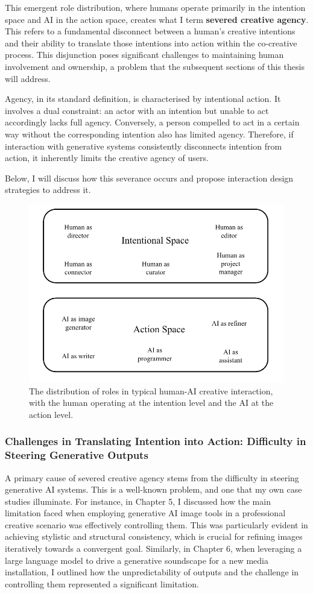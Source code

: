 This emergent role distribution, where humans operate primarily in the intention space and AI in the action space, creates what I term \textbf{severed creative agency}. This refers to a fundamental disconnect between a human's creative intentions and their ability to translate those intentions into action within the co-creative process. This disjunction poses significant challenges to maintaining human involvement and ownership, a problem that the subsequent sections of this thesis will address.

Agency, in its standard definition, is characterised by intentional action. It involves a dual constraint: an actor with an intention but unable to act accordingly lacks full agency. Conversely, a person compelled to act in a certain way without the corresponding intention also has limited agency. Therefore, if interaction with generative systems consistently disconnects intention from action, it inherently limits the creative agency of users.

Below, I will discuss how this severance occurs and propose interaction design strategies to address it.

\begin{figure}[H]
    \centering
    \includegraphics[width=0.75\linewidth]{roles.png}
    \caption{The distribution of roles in typical human-AI creative interaction, with the human operating at the intention level and the AI at the action level.}
    \label{fig:roles-in-spaces}
\end{figure}

\subsubsection{Challenges in Translating Intention into Action: Difficulty in Steering Generative Outputs}

A primary cause of severed creative agency stems from the difficulty in steering generative AI systems. This is a well-known problem, and one that my own case studies illuminate. For instance, in Chapter 5, I discussed how the main limitation faced when employing generative AI image tools in a professional creative scenario was effectively controlling them. This was particularly evident in achieving stylistic and structural consistency, which is crucial for refining images iteratively towards a convergent goal. Similarly, in Chapter 6, when leveraging a large language model to drive a generative soundscape for a new media installation, I outlined how the unpredictability of outputs and the challenge in controlling them represented a significant limitation.

